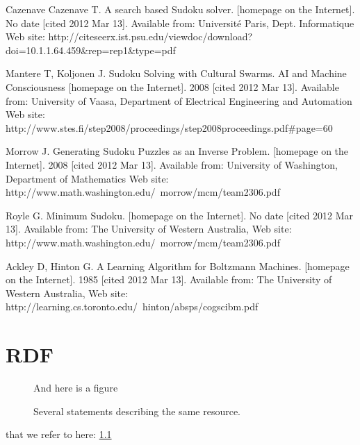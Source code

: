 \documentclass[a4paper,11pt]{kth-mag}
\begin{document}
\begin{thebibliography}{99}
Cazenave Cazenave T. A search based Sudoku solver. [homepage on the Internet]. No date [cited 2012 Mar 13]. Available from: Université Paris, Dept. Informatique Web site: http://citeseerx.ist.psu.edu/viewdoc/download?doi=10.1.1.64.459\&rep=rep1\&type=pdf

Mantere T, Koljonen J. Sudoku Solving with Cultural Swarms. AI and Machine Consciousness [homepage on the Internet]. 2008 [cited 2012 Mar 13]. Available from: University of Vaasa, Department of Electrical Engineering and Automation Web site: http://www.stes.fi/step2008/proceedings/step2008proceedings.pdf\#page=60

Morrow J. Generating Sudoku Puzzles as an Inverse Problem. [homepage on the Internet]. 2008 [cited 2012 Mar 13]. Available from: University of Washington, Department of Mathematics Web site: http://www.math.washington.edu/~morrow/mcm/team2306.pdf

Royle G. Minimum Sudoku. [homepage on the Internet]. No date [cited 2012 Mar 13]. Available from: The University of Western Australia, Web site: http://www.math.washington.edu/~morrow/mcm/team2306.pdf

Ackley D, Hinton G. A Learning Algorithm for Boltzmann Machines. [homepage on the Internet]. 1985 [cited 2012 Mar 13]. Available from: The University of Western Australia, Web site: http://learning.cs.toronto.edu/~hinton/absps/cogscibm.pdf

\end{thebibliography}

\appendix
\addappheadtotoc
\chapter{RDF}\label{appA}

\begin{figure}[ht]
\begin{center}
And here is a figure
\caption{\small{Several statements describing the same resource.}}\label{RDF_4}
\end{center}
\end{figure}

that we refer to here: \ref{RDF_4}
\end{document}
